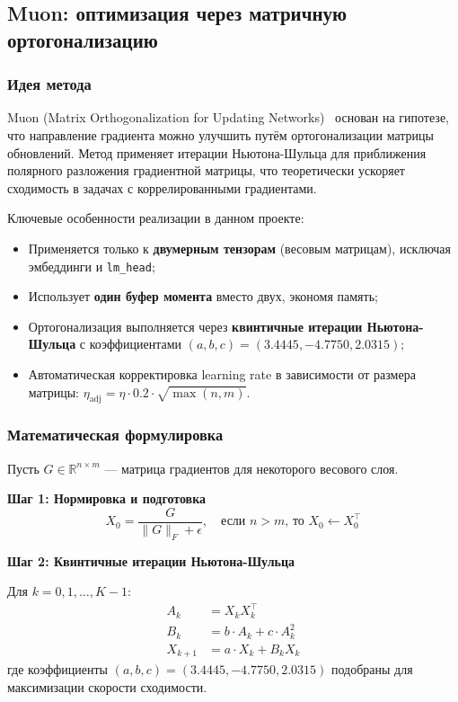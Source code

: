 \documentclass[a4paper,12pt]{article}
\begin{document}
\subsection{Muon: оптимизация через матричную ортогонализацию}

\subsubsection{Идея метода}

Muon (Matrix Orthogonalization for Updating Networks)~\cite{moonshot2024muon} основан на гипотезе, что направление градиента можно улучшить путём ортогонализации матрицы обновлений. Метод применяет итерации Ньютона-Шульца для приближения полярного разложения градиентной матрицы, что теоретически ускоряет сходимость в задачах с коррелированными градиентами.

Ключевые особенности реализации в данном проекте:
\begin{itemize}
    \item Применяется только к \textbf{двумерным тензорам} (весовым матрицам), исключая эмбеддинги и \texttt{lm\_head};
    \item Использует \textbf{один буфер момента} вместо двух, экономя память;
    \item Ортогонализация выполняется через \textbf{квинтичные итерации Ньютона-Шульца} с коэффициентами $(a, b, c) = (3.4445, -4.7750, 2.0315)$;
    \item Автоматическая корректировка learning rate в зависимости от размера матрицы: $\eta_{\text{adj}} = \eta \cdot 0.2 \cdot \sqrt{\max(n, m)}$.
\end{itemize}

\subsubsection{Математическая формулировка}

Пусть $G \in \mathbb{R}^{n \times m}$ --- матрица градиентов для некоторого весового слоя.

\textbf{Шаг 1: Нормировка и подготовка}
\begin{equation}
    X_0 = \frac{G}{\|G\|_F + \epsilon}, \quad \text{если } n > m \text{, то } X_0 \gets X_0^\top
\end{equation}

\textbf{Шаг 2: Квинтичные итерации Ньютона-Шульца}

Для $k = 0, 1, \ldots, K-1$:
\begin{align}
    A_k &= X_k X_k^\top \\
    B_k &= b \cdot A_k + c \cdot A_k^2 \\
    X_{k+1} &= a \cdot X_k + B_k X_k
\end{align}
где коэффициенты $(a, b, c) = (3.4445, -4.7750, 2.0315)$ подобраны для максимизации скорости сходимости.
\end{document}
